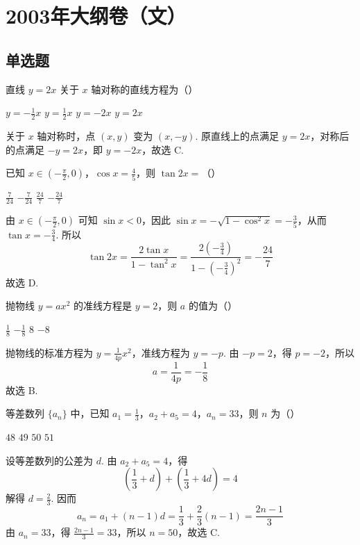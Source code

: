 \chapter{2003年大纲卷（文）}
\section{单选题}
\begin{problem}
直线 \(y=2x\) 关于 \(x\) 轴对称的直线方程为（\quad）

\choices
    {\(y=-\frac{1}{2}x\)}
    {\(y=\frac{1}{2}x\)}
    {\(y=-2x\)}
    {\(y=2x\)}

\begin{solution}
关于 \(x\) 轴对称时，点 \((x,y)\) 变为 \((x,-y)\). 原直线上的点满足 \(y=2x\)，对称后的点满足 \(-y=2x\)，即 \(y=-2x\)，故选 C.
\end{solution}
\end{problem}

\begin{problem}
已知 \(x\in\left(-\frac{\pi}{2},0\right)\)，\(\cos x=\frac45\)，则 \(\tan 2x=\)（\quad）

\choices
    {\(\frac{7}{24}\)}
    {\(-\frac{7}{24}\)}
    {\(\frac{24}{7}\)}
    {\(-\frac{24}{7}\)}

\begin{solution}
由 \(x\in\left(-\frac{\pi}{2},0\right)\) 可知 \(\sin x<0\)，因此 \(\sin x=-\sqrt{1-\cos ^2x}=-\frac35\)，从而 \(\tan x=-\frac34\). 所以
\[
\tan 2x=\frac{2\tan x}{1-\tan ^2x}
=\frac{2\left(-\frac34\right)}{1-\left(-\frac34\right)^2}
=-\frac{24}{7}
\]
故选 D.
\end{solution}
\end{problem}

\begin{problem}
抛物线 \(y=ax^2\) 的准线方程是 \(y=2\)，则 \(a\) 的值为（\quad）

\choices
    {\(\frac18\)}
    {\(-\frac18\)}
    {\(8\)}
    {\(-8\)}

\begin{solution}
抛物线的标准方程为 \(y=\frac{1}{4p}x^2\)，准线方程为 \(y=-p\). 由 \(-p=2\)，得 \(p=-2\)，所以
\[
a=\frac{1}{4p}=-\frac18
\]
故选 B.
\end{solution}
\end{problem}

\begin{problem}
等差数列 \(\{a_n\}\) 中，已知 \(a_1=\frac13\)，\(a_2+a_5=4\)，\(a_n=33\)，则 \(n\) 为（\quad）

\choices
    {\(48\)}
    {\(49\)}
    {\(50\)}
    {\(51\)}

\begin{solution}
设等差数列的公差为 \(d\). 由 \(a_2+a_5=4\)，得
\[
\left(\frac13+d\right)+\left(\frac13+4d\right)=4
\]
解得 \(d=\frac23\). 因而
\[
a_n=a_1+(n-1)d=\frac13+\frac23(n-1)=\frac{2n-1}{3}
\]
由 \(a_n=33\)，得 \(\frac{2n-1}{3}=33\)，所以 \(n=50\)，故选 C.
\end{solution}
\end{problem}

